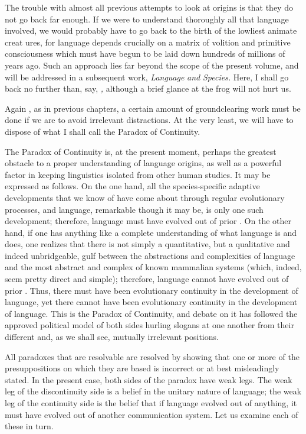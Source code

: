 The trouble with almost all previous attempts to look at origins is that they do not go back far enough. If we were to understand thoroughly all that language involved, we would probably have to go back to the birth of the lowliest animate creat ures, for language depends crucially on a matrix of volition and primitive consciousness which must have begun to be laid down hundreds of millions of years ago. Such an approach lies far beyond the scope of the present volume, and will be addressed in a subsequent work, \textit{Language} \textit{and} \textit{Species.} Here, I shall go back no further than, say, \textit{,} although a brief glance at the frog will not hurt us.

Again , as in previous chapters, a certain amount of ground\-clearing work must be done if we are to avoid irrelevant distractions. At the very least, we will have to dispose of what I shall call the Para\-dox of Continuity.

The Paradox of Continuity is, at the present moment, perhaps the greatest obstacle to a proper understanding of language origins, as well as a powerful factor in keeping linguistics isolated from other human studies. It may be expressed as follows. On the one hand, all the species-specific adaptive developments that we know of have come about through regular evolutionary processes, and language, remarkable though it may be, is only one such development; therefore, language must have evolved out of prior . On the other hand, if one has anything like a complete understanding of what language is and does, one realizes that there is not simply a quantitative, but a qualitative and indeed unbridgeable, gulf between
the abstractions and complexities of language and the most abstract and complex of known mammalian systems (which, indeed, seem pretty direct and simple); therefore, language cannot have evolved out of prior . Thus, there must have been evolutionary continuity in the development of language, yet there cannot have been evolutionary continuity in the development of language. This is the Paradox of Continuity, and debate on it has followed the approved political model of both sides hurling slogans at one another from their different and, as we shall see, mutually irrele\-vant positions.

All paradoxes that are resolvable are resolved by showing that one or more of the presuppositions on which they are based is incorrect or at best misleadingly stated. In the present case, both sides of the paradox have weak legs. The weak leg of the discontinuity side is a belief in the unitary nature of language; the weak leg of the continuity side is the belief that if language evolved out of anything, it must have evolved out of another communication system. Let us examine each of these in turn.

